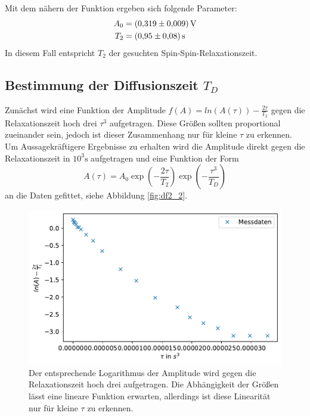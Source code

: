Mit dem nähern der Funktion ergeben sich folgende Parameter:
\begin{align*}
    A_0 &= \SI{0.319 +- 0.009}{\volt}\\
    T_2 &= \SI{0.95 +- 0.08}{\second}
\end{align*}
In diesem Fall entspricht $T_2$ der gesuchten Spin-Spin-Relaxationszeit.
\newpage
\subsection{Bestimmung der Diffusionszeit $T_D$}
Zunächst wird eine Funktion der Amplitude $f(A) = ln(A(\tau)) - \frac{2\tau}{T_2}$ gegen die Relaxationszeit hoch drei $\tau^3$ aufgetragen. 
Diese Größen sollten proportional zueinander sein, jedoch ist dieser Zusammenhang nur für kleine $\tau$ zu erkennen.
Um Aussagekräftigere Ergebnisse zu erhalten wird die Amplitude direkt gegen die Relaxationszeit in $10^3 \si{\second}$ aufgetragen und eine Funktion der Form
\begin{equation*}
    A\left(\tau\right) = A_0 \exp\left(- \frac{2\tau}{T_2}\right) \exp\left(-\frac{\tau^3}{T_D}\right)
\end{equation*}
an die Daten gefittet, siehe Abbildung \ref{fig:df2_2}.
\begin{figure}[ht]
    \center
    \includegraphics[scale = 0.75]{plots/df2.pdf}
    \caption{Der entsprechende Logarithmus der Amplitude wird gegen die Relaxationszeit hoch drei aufgetragen. Die Abhängigkeit der Größen lässt eine lineare Funktion erwarten, allerdings ist diese Linearität nur für kleine $\tau$ zu erkennen.}
    \label{fig:df2}
\end{figure}
